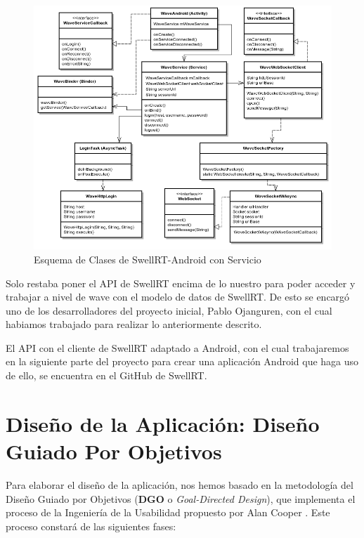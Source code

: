   \begin{figure}[H]
   \centering
	\includegraphics[keepaspectratio, scale=0.5]{Media/Diagrams/waveServiceClassDiagram.png}
    \caption{Esquema de Clases de SwellRT-Android con Servicio}
   \label{fig:sequenceDiagram_waveWebSocket}
  \end{figure}
    
    Solo restaba poner el API de SwellRT encima de lo nuestro para poder acceder y trabajar a nivel de wave con el modelo de datos de SwellRT. De esto se encargó uno de los desarrolladores del proyecto inicial, Pablo Ojanguren, con el cual habiamos trabajado para realizar lo anteriormente descrito.
    
    El API con el cliente de SwellRT adaptado a Android, con el cual trabajaremos en la siguiente parte del proyecto para crear una aplicación Android que haga uso de ello, se encuentra en el GitHub de SwellRT\cite{ref:swellRT_android_github}. 


\section{Diseño de la Aplicación: Diseño Guiado Por Objetivos}

Para elaborar el diseño de la aplicación, nos hemos basado en la metodología del Diseño Guiado por Objetivos (\textbf{DGO} o \textit{Goal-Directed Design}), que implementa el proceso de la Ingeniería de la Usabilidad propuesto por Alan Cooper \cite{ref:bookAlanCooper}. Este proceso constará de las siguientes fases:

